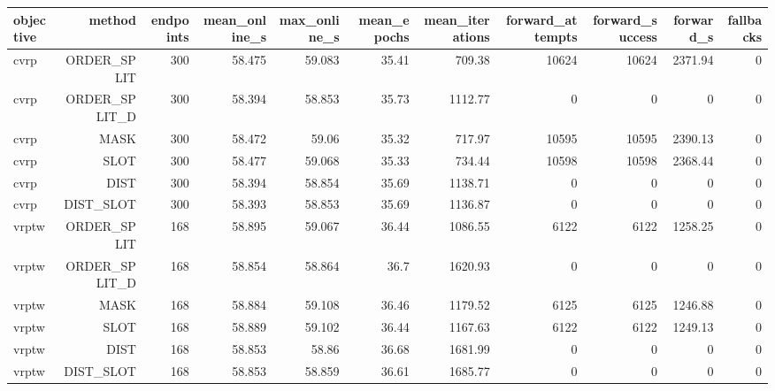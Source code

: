 \begin{tabular}{lrrrrrrrrrr}
\toprule
objective & method & endpoints & mean\_online\_s & max\_online\_s & mean\_epochs & mean\_iterations & forward\_attempts & forward\_success & forward\_s & fallbacks \\
\midrule
cvrp & ORDER\_SPLIT & 300 & 58.475 & 59.083 & 35.41 & 709.38 & 10624 & 10624 & 2371.94 & 0 \\
cvrp & ORDER\_SPLIT\_D & 300 & 58.394 & 58.853 & 35.73 & 1112.77 & 0 & 0 & 0 & 0 \\
cvrp & MASK & 300 & 58.472 & 59.06 & 35.32 & 717.97 & 10595 & 10595 & 2390.13 & 0 \\
cvrp & SLOT & 300 & 58.477 & 59.068 & 35.33 & 734.44 & 10598 & 10598 & 2368.44 & 0 \\
cvrp & DIST & 300 & 58.394 & 58.854 & 35.69 & 1138.71 & 0 & 0 & 0 & 0 \\
cvrp & DIST\_SLOT & 300 & 58.393 & 58.853 & 35.69 & 1136.87 & 0 & 0 & 0 & 0 \\
vrptw & ORDER\_SPLIT & 168 & 58.895 & 59.067 & 36.44 & 1086.55 & 6122 & 6122 & 1258.25 & 0 \\
vrptw & ORDER\_SPLIT\_D & 168 & 58.854 & 58.864 & 36.7 & 1620.93 & 0 & 0 & 0 & 0 \\
vrptw & MASK & 168 & 58.884 & 59.108 & 36.46 & 1179.52 & 6125 & 6125 & 1246.88 & 0 \\
vrptw & SLOT & 168 & 58.889 & 59.102 & 36.44 & 1167.63 & 6122 & 6122 & 1249.13 & 0 \\
vrptw & DIST & 168 & 58.853 & 58.86 & 36.68 & 1681.99 & 0 & 0 & 0 & 0 \\
vrptw & DIST\_SLOT & 168 & 58.853 & 58.859 & 36.61 & 1685.77 & 0 & 0 & 0 & 0 \\
\bottomrule
\end{tabular}
